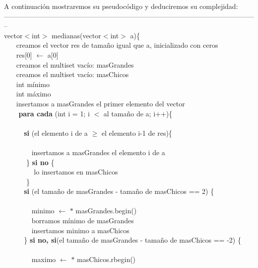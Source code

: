 A continuación mostraremos su pseudocódigo y deduciremos su complejidad: \\
--------------------------------------------------------------------------------------------------------------\\
vector$<$int$>$ medianas(vector$<$int$>$ a)\{ \\
$~~~~~~~~$creamos el vector res de tamaño igual que a, inicializado con ceros \\
$~~~~~~~~$res[0] $\leftarrow$ a[0] \\
$~~~~~~~~$creamos el multiset vacío: masGrandes  \\
$~~~~~~~~$creamos el multiset vacío: masChicos  \\
$~~~~~~~~$int mínimo \\
$~~~~~~~~$int máximo \\
$~~~~~~~~$insertamos a masGrandes el primer elemento del vector  \\
$~~~~~~~~$ \textbf{para cada} (int i = 1; i $<$ al tamaño de a; i++)\{ \\  \\
$~~~~~~~~~~~~~$\textbf{si} (el elemento i de a $\geq$ el elemento i-1 de res)\{ \\  \\
$~~~~~~~~~~~~~~~~~~$insertamos a masGrandes el elemento i de a  \\
$~~~~~~~~~~~~~$ \} \textbf{si no} \{ \\
$~~~~~~~~~~~~~~~~~~$ lo insertamos en masChicos  \\
$~~~~~~~~~~~~~$ \} \\
$~~~~~~~~~~~~~$\textbf{si} (el tamaño de masGrandes - tamaño de masChicos == 2) \{ \\ \\
$~~~~~~~~~~~~~~~~~~$minimo $\leftarrow$ $\ast$ masGrandes.begin() \\
$~~~~~~~~~~~~~~~~~~$borramos mínimo de masGrandes   \\
$~~~~~~~~~~~~~~~~~~$insertamos minimo a masChicos  \\
$~~~~~~~~~~~~~$\} \textbf{si no, si}(el tamaño de masGrandes - tamaño de masChicos == -2) \{ \\ \\
$~~~~~~~~~~~~~~~~~~$maximo $\leftarrow$ $\ast$ masChicos.rbegin() \\
